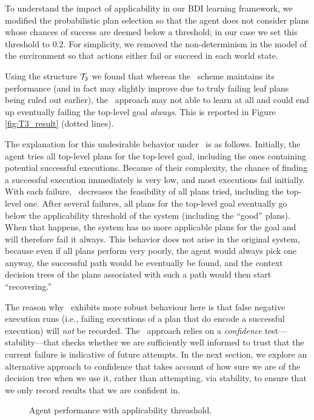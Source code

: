To understand the impact of applicability in our BDI learning framework, we
modified the probabilistic plan selection so that the agent does not consider
plans whose chances of success are deemed below a threshold; in our case we set
this threshold to $0.2$.
For simplicity, we  removed the non-determinism in the model of the
environment so that actions either fail or succeed in each world state.

Using the structure ${\mathcal{T}}_3$ we found that whereas the \BUL\ scheme maintains its
performance (and in fact may slightly improve due to truly failing leaf plans
being ruled out earlier), the \CL\ approach may not able to learn at all and
could end up eventually failing the top-level goal \emph{always}. This is
reported in Figure \ref{fig:T3_result} (dotted lines).

The explanation for this undesirable behavior under \CL\ is as follows.
Initially, the agent tries all top-level plans for the top-level goal, including
the ones containing potential successful executions. Because of their complexity,
the chance of finding a successful execution immediately is very low, and most
executions fail initially. With each failure, \CL\ decreases the feasibility of
all plans tried, including the top-level one.  After several failures, all plans
for the top-level goal eventually go below the applicability threshold of the
system (including the ``good'' plans). When that happens, the system has no more
applicable plans for the goal and will therefore fail it always.
This behavior does not arise in the original system, because even if all plans
perform very poorly, the agent would always pick one anyway, the successful path
would be eventually be found, and the context decision trees of the plans
associated with such a path would then start ``recovering.''


The reason why \BUL\ exhibits more robust behaviour here is that false negative
execution runs (i.e., failing executions of a plan that do encode a successful
execution) will \emph{not} be recorded.
The \BUL\ approach relies on a \emph{confidence} test---stability---that checks
whether we are sufficiently well informed to trust that the current failure is
indicative of future attempts.
In the next section, we explore an alternative approach to confidence 
that takes account of how sure we are of the decision tree when we use
it, rather than attempting, via stability, to ensure that we only
record results that we are confident in.




\begin{figure}[t]
   \centering
   
   \caption{Agent performance with applicability threashold.}
   \label{fig:performance-applicability}
\end{figure}
